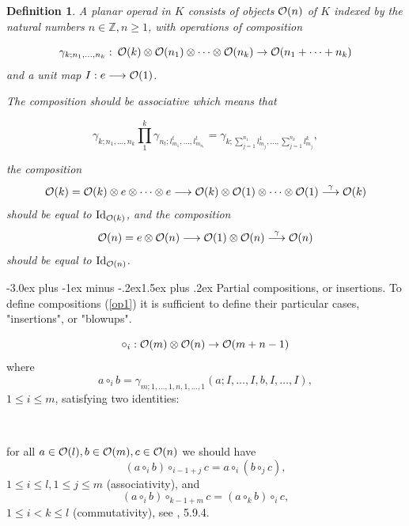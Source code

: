 \documentclass[12pt,a4paper]{article}
\makeatletter
\newtheorem{dfn}[theorem]{Definition}
\renewcommand{\subsection}{\@startsection{subsection}{2}{0pt}%
{-3.0ex plus -1ex minus -.2ex}{-1.5ex plus .2ex}%
{\normalfont\large\bf}}
\renewcommand{\subsection}{\@startsection{subsection}{2}{0pt}%
{-3.0ex plus -1ex minus -.2ex}{1.5ex plus .2ex}%
{\normalfont\large\bf}}
\def\Zset{{\mathbb Z}}
\def\CO{{\cal O}}
\renewcommand{\subsection}{\@startsection{subsection}{2}{0pt}%
{-3.0ex plus -1ex minus -.2ex}{-1.5ex plus .2ex}%
{\normalfont\normalsize\bf}}
\renewcommand{\subsection}{\@startsection{subsection}{2}{0pt}%
{-3.0ex plus -1ex minus -.2ex}{1.5ex plus .2ex}%
{\normalfont\normalsize\bf}}
\def\Zset{{\mathbb Z}}
\def\lra{\longrightarrow}
\makeatother
\begin{document}
\begin{dfn}\label{def-planar}
A {\em planar operad} in $K$ consists of objects $\CO(n)$ of $K$ indexed by the natural numbers 
$n\in \Zset, n \geq 1$, with  operations of composition

\begin{equation}\label{op1}
\gamma_{k;n_1, \ldots, n_k}\,\colon\, \CO(k)\otimes \CO (n_1)\otimes \cdots \otimes \CO(n_k)\to \CO(n_1+ \cdots +n_k)
\end{equation}
and a unit map $I: e\lra \CO(1)$.

The composition should be associative which means that  

\begin{equation}\label{com1}
\gamma_{k; n_1, \ldots,  n_k }
\prod_1^k
\gamma_{n_t;l_{m_1}^t, \ldots, l_{m_{n_t}}^t}=
\gamma_{k; \sum_{j=1}^{n_1 }l^1_{m_j}, \ldots,  \sum_{j=1}^{n_k }l^k_{m_j}},
\end{equation}
 
the composition 
\[
\CO(k) = \CO(k)\otimes e\otimes \cdots \otimes e \lra 
\CO(k)\otimes \CO (1)\otimes \cdots \otimes \CO(1)\overset\gamma\lra \CO(k)
\]
should be equal to $\text{Id}_{\CO(k)}$, and the composition 
\[
\CO(n) = e\otimes \CO(n) \lra \CO(1)\otimes\CO(n)\overset\gamma\lra \CO(n) 
\]
should be equal to $\text{Id}_{\CO(n)}$.

\end{dfn}

\subsection{Partial compositions, or insertions.}\label{part-comp} To define compositions (\ref{op1}) it is sufficient to define their 
particular cases, "insertions", or "blowups".

\begin{equation}\label{compos-ins}
\circ_i : \CO(m)\otimes \CO(n) \to \CO(m+n-1)
\end{equation}
where
\[
a\circ_i b = \gamma_{m;1,\ldots,1,n,1,\ldots, 1}(a;I,\ldots, I,b,I,\ldots, I),
\]
$1\leq i\leq m$, 
satisfying two identities:

\

for all $a\in \CO(l), b\in \CO(m), c\in \CO(n)$ we should have
\[
(a\circ_i b)\circ_{i-1+j} c = a\circ_i (b\circ_j c),
\] 
$1\leq i\leq l, 1\leq j\leq m$ 
(associativity), and
\[
(a\circ_i b)\circ_{k-1+m}c = (a\circ_k b)\circ_i c,
\]
$1\leq i < k\leq l$ (commutativity), 
see \cite{LV}, 5.9.4.

\ 
\end{document}
